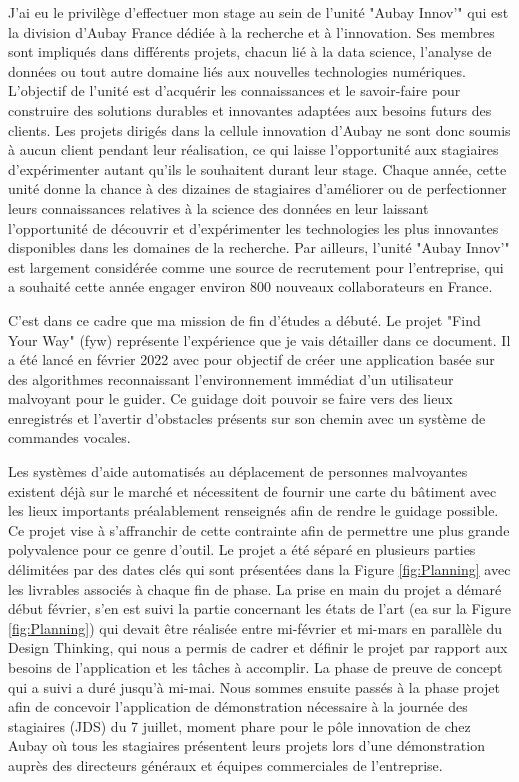 \documentclass[11pt]{article}
\begin{document}
    J'ai eu le privilège d'effectuer mon stage au sein de l'unité "Aubay Innov'" qui est la division d’Aubay France dédiée 
    à la recherche et à l'innovation. Ses membres sont impliqués dans différents projets, chacun lié à la data science, l'analyse 
    de données ou tout autre domaine liés aux nouvelles technologies numériques. L'objectif de l'unité est d'acquérir 
    les connaissances et le savoir-faire pour construire des solutions durables et innovantes adaptées aux besoins futurs des clients. 
    Les projets dirigés dans la cellule innovation d'Aubay ne sont donc soumis à aucun client pendant leur réalisation, 
    ce qui laisse l'opportunité aux stagiaires d'expérimenter autant qu'ils le souhaitent durant leur stage.
    Chaque année, cette unité donne la chance à des dizaines de stagiaires d'améliorer ou de perfectionner leurs connaissances
    relatives à la science des données en leur laissant l'opportunité de découvrir et d'expérimenter les technologies les plus 
    innovantes disponibles dans les domaines de la recherche. Par ailleurs, l'unité "Aubay Innov'" est largement considérée comme 
    une source de recrutement pour l'entreprise, qui a souhaité cette année engager environ 800 nouveaux collaborateurs en France. 
    
    C'est dans ce cadre que ma mission de fin d'études a débuté. Le projet "Find Your Way" (\acrshort{fyw}) représente l'expérience que je 
    vais détailler dans ce document. Il a été lancé en février 2022 avec pour objectif de créer une application
    basée sur des algorithmes reconnaissant l'environnement immédiat d'un utilisateur malvoyant pour le guider. 
    Ce guidage doit pouvoir se faire vers des lieux enregistrés et l'avertir d'obstacles présents sur son chemin avec un système de commandes 
    vocales.     
    
    Les systèmes d'aide automatisés au déplacement de personnes malvoyantes existent déjà sur le marché et nécessitent de fournir une 
    carte du bâtiment avec les lieux importants préalablement renseignés afin de rendre le guidage possible. Ce projet vise à s'affranchir 
    de cette contrainte afin de permettre une plus grande polyvalence pour ce genre d'outil.
    Le projet a été séparé en plusieurs parties délimitées par des dates clés qui sont présentées dans la Figure \ref{fig:Planning} 
    avec les livrables associés à chaque fin de phase.
    La prise en main du projet a démaré début février, s'en est suivi la partie concernant les états de l'art (\acrshort{ea} sur la Figure \ref{fig:Planning}) 
    qui devait être réalisée entre mi-février et mi-mars en parallèle du Design Thinking, qui nous a permis de cadrer et définir le projet par 
    rapport aux besoins de l'application et les tâches à accomplir. La phase de preuve de concept qui a suivi a duré jusqu'à mi-mai. 
    Nous sommes ensuite passés à la phase projet afin de concevoir l'application de démonstration nécessaire à la journée des stagiaires (JDS) 
    du 7 juillet, moment phare pour le pôle innovation de chez Aubay où tous 
    les stagiaires présentent leurs projets lors d'une démonstration auprès des directeurs généraux et équipes commerciales de l'entreprise.
\end{document}
